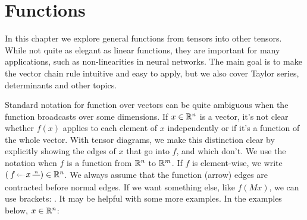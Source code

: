 

\chapter{Functions}\label{chapter:functions}


In this chapter we explore general functions from tensors into other tensors.
While not quite as elegant as linear functions, they are important for many applications, such as non-linearities in neural networks.
The main goal is to make the vector chain rule intuitive and easy to apply, but we also cover Taylor series, determinants and other topics.

Standard notation for function over vectors can be quite ambiguous when the function broadcasts over some dimensions.
If $x\in\mathbb R^n$ is a vector, it's not clear whether $f(x)$ applies to each element of $x$ independently or if it's a function of the whole vector.
With tensor diagrams, we make this distinction clear by explicitly showing the edges of $x$ that go into $f$, and which don't.
We use the notation 
when $f$ is a function from $\mathbb R^n$ to $\mathbb R^m$.
If $f$ is element-wise, we write
$(\tikz[baseline=-.25em, inner sep=2pt]{
   \draw[->, densely dotted] (.3,0) node[right](x){$x$} -- (0,0) node(f)[left]{$f$};
   \draw (x) -- ++(.5,0) node[midway, above, font=\tiny] {$n$};
}) \in \R^n$.
We always assume that the function (arrow) edges are contracted before normal edges.
If we want something else, like $f(Mx)$, we can use brackets:
.
It may be helpful with some more examples.
In the examples below, $x\in \mathbb R^n$:
\vspace{-1.5em}
